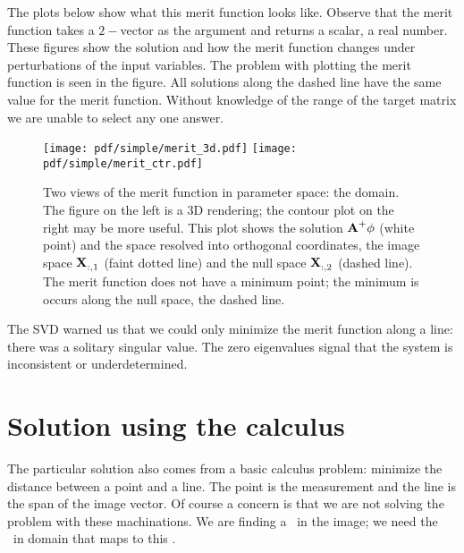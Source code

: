The plots below show what this merit function looks like. Observe that the merit function takes a $2-$vector as the argument and returns a scalar, a real number. These figures show the solution and how the merit function changes under perturbations of the input variables. The problem with plotting the merit function is seen in the figure. All solutions along the dashed line have the same value for the merit function. Without knowledge of the range of the target matrix we are unable to select any one answer.

\begin{figure}[h] %
   \centering
   \texttt{[image: pdf/simple/merit\_3d.pdf]} \quad
   \texttt{[image: pdf/simple/merit\_ctr.pdf]}
   \caption{Two views of the merit function in parameter space: the domain. The figure on the left is a 3D rendering; the contour plot on the right may be more useful. This plot shows the solution $\textbf{A}^{\mathrm{+}}\phi$ (white point) and the space resolved into orthogonal coordinates, the image space  $\textbf{X}^{\mathrm{}}_{:,1}$ (faint dotted line) and the null space $\textbf{X}^{\mathrm{}}_{:,2}$ (dashed line). The merit function does not have a minimum point; the minimum is occurs along the null space, the dashed line.}
   \label{fig:2:merit}
\end{figure}

The SVD warned us that we could only minimize the merit function along a line: there was a solitary singular value. The zero eigenvalues signal that the system is inconsistent or underdetermined.

\section{Solution using the calculus}
The particular solution also comes from a basic calculus problem: minimize the distance between a point and a line. The point is the measurement and the line is the span of the image vector. Of course a concern is that we are not solving the problem with these machinations. We are finding a \vvv \ in the image; we need the \vv \ in domain that maps to this \vvv.

